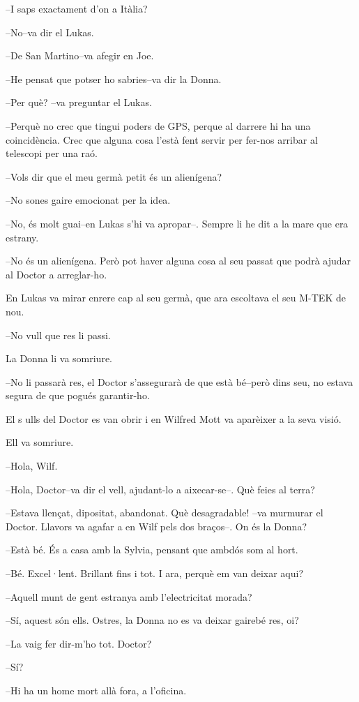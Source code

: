 --I saps exactament d'on a Itàlia?

--No--va dir el Lukas.

--De San Martino--va afegir en Joe.

--He pensat que potser ho sabries--va dir la Donna.

--Per què? --va preguntar el Lukas.

--Perquè no crec que tingui poders de GPS, perque al darrere hi ha una
coincidència. Crec que alguna cosa l'està fent servir per fer-nos
arribar al telescopi per una raó.

--Vols dir que el meu germà petit és un alienígena?

--No sones gaire emocionat per la idea.

--No, és molt guai--en Lukas s'hi va apropar--. Sempre li he dit a la
mare que era estrany.

--No és un alienígena. Però pot haver alguna cosa al seu passat que
podrà ajudar al Doctor a arreglar-ho.

En Lukas va mirar enrere cap al seu germà, que ara escoltava el seu
M-TEK de nou.

--No vull que res li passi.

La Donna li va somriure.

--No li passarà res, el Doctor s'assegurarà de que està bé--però dins
seu, no estava segura de que pogués garantir-ho.

El s ulls del Doctor es van obrir i en Wilfred Mott va aparèixer a la
seva visió.

Ell va somriure.

--Hola, Wilf.

--Hola, Doctor--va dir el vell, ajudant-lo a aixecar-se--. Què feies al
terra?

--Estava llençat, dipositat, abandonat. Què desagradable! --va murmurar
el Doctor. Llavors va agafar a en Wilf pels dos braços--. On és la
Donna?

--Està bé. És a casa amb la Sylvia, pensant que ambdós som al hort.

--Bé. Excel·lent. Brillant fins i tot. I ara, perquè em van deixar aqui?

--Aquell munt de gent estranya amb l'electricitat morada?

--Sí, aquest són ells. Ostres, la Donna no es va deixar gairebé res, oi?

--La vaig fer dir-m'ho tot. Doctor?

--Sí?

--Hi ha un home mort allà fora, a l'oficina.


